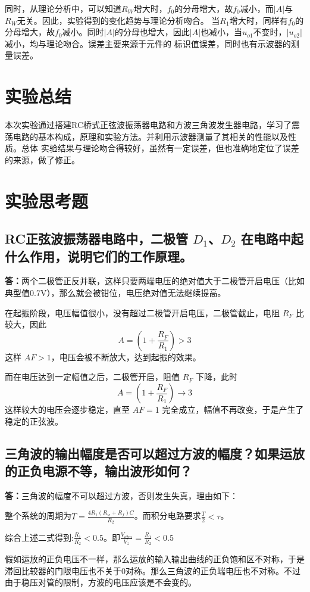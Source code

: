 \documentclass[a4paper,11pt,UTF8]{ctexart}
\newcommand{\p}{\par}
\newcommand{\np}{\par\noindent}
\begin{document}
  同时，从理论分析中，可以知道$R_W$增大时，$f_0$的分母增大，故$f_0$减小，而$|A|$与$R_W$无关。因此，实验得到的变化趋势与理论分析吻合。
  当$R_1$增大时，同样有$f_0$的分母增大，故$f_0$减小。同时$|A|$的分母也增大，因此$|A|$也减小，当$u_{o1}$不变时，$|u_{o2}|$减小，均与理论吻合。误差主要来源于元件的
  标识值误差，同时也有示波器的测量误差。
\section{实验总结}
本次实验通过搭建RC桥式正弦波振荡器电路和方波三角波发生器电路，学习了震荡电路的基本构成，原理和实验方法。并利用示波器测量了其相关的性能以及性质。总体
实验结果与理论吻合得较好，虽然有一定误差，但也准确地定位了误差的来源，做了修正。
\section{实验思考题}
 \subsection{RC正弦波振荡器电路中，二极管 $D_1$、$D_2$ 在电路中起什么作用，说明它们的工作原理。}
 \np \textbf{答：}两个二极管正反并联，这样只要两端电压的绝对值大于二极管开启电压（比如典型值0.7V），那么就会被钳位，电压绝对值无法继续提高。
 \p 在起振阶段，电压幅值很小，没有超过二极管开启电压，二极管截止，电阻 $R_F$ 比较大，因此
 \[ A=\left( 1+\frac{R_F}{R_1} \right)>3 \]
 这样 $AF>1$，电压会被不断放大，达到起振的效果。
 \p 而在电压达到一定幅值之后，二极管开启，阻值 $R_F$ 下降，此时
 \[ A=\left( 1+\frac{R_F}{R_1} \right)\to3 \]
 这样较大的电压会逐步稳定，直至 $AF=1$ 完全成立，幅值不再改变，于是产生了稳定的正弦波。
 \subsection{三角波的输出幅度是否可以超过方波的幅度？如果运放的正负电源不等，输出波形如何？}
 \textbf{答：}三角波的幅度不可以超过方波，否则发生失真，理由如下：
 \p 整个系统的周期为$T=\frac{4R_1(R_w+R_f)C}{R_2}$。而积分电路要求$\frac{T}{2}<\tau$。
 \p 综合上述二式得到:$\frac{R_1}{R_2}<0.5$。即$\frac{V_{o2m}}{V_z}=\frac{R_1}{R_2}<0.5$
 \p 假如运放的正负电压不一样，那么运放的输入输出曲线的正负饱和区不对称，于是滞回比较器的门限电压也不关于0对称。那么三角波的正负端电压也不对称。不过由于稳压对管的限制，方波的电压应该是不会变的。
\end{document}
